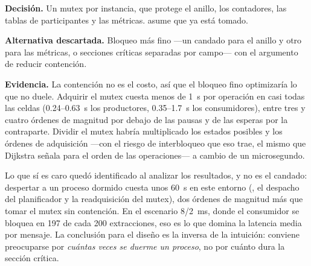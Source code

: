 \textbf{Decisión.} Un mutex por instancia, que protege el anillo, los
contadores, las tablas de participantes y las métricas. 
asume que ya está tomado.

\textbf{Alternativa descartada.} Bloqueo más fino ---un candado para el
anillo y otro para las métricas, o secciones críticas separadas por
campo--- con el argumento de reducir contención.

\textbf{Evidencia.} La contención no es el costo, así que el bloqueo fino
optimizaría lo que no duele. Adquirir el mutex cuesta menos de
1~\textmu s por operación en casi todas las celdas (0.24--0.63~\textmu s los
productores, 0.35--1.7~\textmu s los consumidores), entre tres y cuatro
órdenes de magnitud por debajo de las pausas y de las esperas por la
contraparte. Dividir el mutex habría multiplicado los estados posibles y los
órdenes de adquisición ---con el riesgo de interbloqueo que eso trae, el
mismo que Dijkstra señala para el orden de las operaciones--- a cambio de un
microsegundo.

Lo que sí es caro quedó identificado al analizar los resultados, y no es el
candado: despertar a un proceso dormido cuesta unos 60~\textmu s en este
entorno (, el despacho del planificador y la
readquisición del mutex), dos órdenes de magnitud más que tomar el mutex sin
contención. En el escenario 8/2~ms, donde el consumidor se bloquea en 197 de
cada 200 extracciones, eso es lo que domina la latencia media por mensaje.
La conclusión para el diseño es la inversa de la intuición: conviene
preocuparse por \emph{cuántas veces se duerme un proceso}, no por cuánto
dura la sección crítica.
